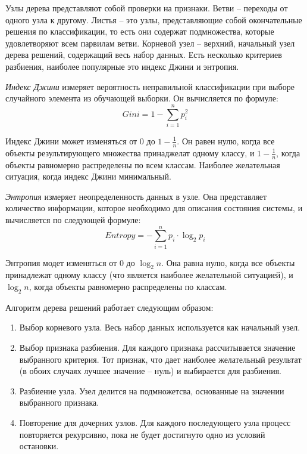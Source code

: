 Узлы дерева представляют собой проверки на признаки. Ветви -- переходы от одного узла к другому. Листья -- это узлы, представляющие собой окончательные решения по классификации, то есть они содержат подмножества, которые удовлетворяют всем парвилам ветви. Корневой узел -- верхний, начальный узел дерева решений, содержащий весь набор данных. Есть несколько критериев разбиения, наиболее популярные это индекс Джини и энтропия.

\textit{Индекс Джини} измеряет вероятность неправильной классификации при выборе случайного элемента из обучающей выборки. Он вычисляется по формуле:
$$
Gini = 1 - \displaystyle\sum_{i=1}^{n} p_i^2
$$

\vspace{0.3cm}
Индекс Джини может изменяться от 0 до $1 - \frac{1}{n}$. Он равен нулю, когда все объекты результирующего множества принаджелат одному классу, и $1 - \frac{1}{n}$, когда объекты равномерно распределены по всем классам. Наиболее желательная ситуация, когда индекс Джини минимальный.


\textit{Энтропия} измеряет неопределенность данных в узле. Она представляет количество информации, которое необходимо для описания состояния системы, и вычисляется по следующей формуле:
$$
Entropy = - \displaystyle\sum_{i=1}^{n} p_i \cdot \log_2 p_i
$$


Энтропия модет изменяться от 0 до $\log_2 n$. Она равна нулю, когда все объекты принадлежат одному классу (что является наиболее желательной ситуацией), и $\log_2 n$, когда объекты равномерно распределены по классам. 

Алгоритм дерева решений работает следующим образом:

\begin{enumerate}[itemindent=2cm, leftmargin=0cm, labelsep=0.3cm, topsep=0cm, itemsep=0cm, parsep=0cm, label=\arabic*., after=\vspace{-0.1cm}, before=\vspace{-0.1cm}]
    \item Выбор корневого узла. Весь набор данных используется как начальный узел.
    \item Выбор признака разбиения. Для каждого признака рассчитывается значение выбранного критерия. Тот признак, что дает наиболее желательный результат (в обоих случаях лучшее значение -- нуль) и выбирается для разбиения.
    \item Разбиение узла. Узел делится на подмножетсва, основанные на значении выбранного признака.
    \item Повторение для дочерних узлов. Для каждого последующего узла процесс повторяется рекурсивно, пока не будет достигнуто одно из условий остановки.
\end{enumerate}

